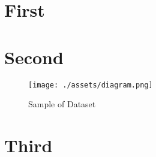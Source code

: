\section{First}
\lipsum[6-10]
\section{Second}
\lipsum[11-12]
\begin{figure}
    \centering
    \texttt{[image: ./assets/diagram.png]}
    \caption{Sample of Dataset}
    \label{figure:sample-dataset}
\end{figure}
\lipsum[13-15]
\section{Third}
\lipsum[16-20]
